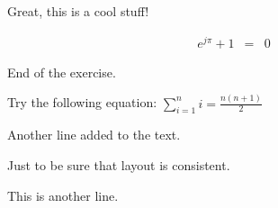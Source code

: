 \documentclass{article}
\begin{document}
Great, this is a cool stuff!

\begin{eqnarray}
  \label{eqn:simple}
  e^{j\pi} + 1 &=& 0
\end{eqnarray}

End of the exercise.

Try the following equation: $\sum_{i=1}^n i = \frac{n(n+1)}2$

Another line added to the text.

Just to be sure that layout is consistent.

This is another line.
\end{document}
